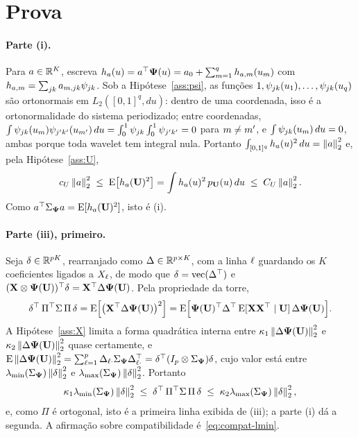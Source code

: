 \documentclass[11pt]{article}
\newcommand{\bPsi}{\boldsymbol{\Psi}}
\newcommand{\kron}{\otimes}
\newcommand{\lmin}{\lambda_{\min}}
\newcommand{\lmax}{\lambda_{\max}}
\DeclareMathOperator{\vecop}{vec}
\begin{document}
\section*{Prova}

\paragraph{Parte (i).}
Para $a \in \mathbb{R}^{K}$, escreva $h_a(u) = a\T\bPsi(u) = a_0 + \sum_{\md=1}^{q} h_{a,\md}(u_{\md})$ com
$h_{a,m} = \sum_{jk} a_{m,jk}\psi_{jk}$. Sob a Hipótese~\ref{ass:psi}, as funções
$1, \psi_{jk}(u_1), \ldots, \psi_{jk}(u_q)$ são ortonormais em $L_2([0,1]^q, du)$: dentro de uma
coordenada, isso é a ortonormalidade do sistema periodizado; entre coordenadas,
$\int \psi_{jk}(u_{m})\psi_{j'k'}(u_{m'})\,du = \int_0^1 \psi_{jk}\int_0^1 \psi_{j'k'} = 0$ para
$m \ne m'$, e $\int \psi_{jk}(u_{m})\,du = 0$, ambas porque toda wavelet tem integral nula.
Portanto $\int_{[0,1]^q} h_a(u)^2\,du = \left\lVert a \right\rVert_2^2$ e, pela Hipótese~\ref{ass:U},
\[
    c_U\left\lVert a \right\rVert_2^2 \;\le\; \mathrm{E}\bigl[h_a(\mathbf{U})^2\bigr] = \int h_a(u)^2\,p_{\mathbf{U}}(u)\,du \;\le\; C_U\left\lVert a \right\rVert_2^2 .
\]
Como $a\T\Gram_{\bPsi}a = \E[h_a(\bU)^2]$, isto é (i).

\paragraph{Parte (iii), primeiro.}
Seja $\delta \in \mathbb{R}^{pK}$, rearranjado como $\Delta \in \mathbb{R}^{p \times K}$, com a linha $\ell$ guardando os $K$
coeficientes ligados a $X_{\ell}$, de modo que $\delta = \vecop(\Delta\T)$ e
$(\bX \kron \bPsi(\bU))\T\delta = \bX\T\Delta\bPsi(\bU)$. Pela propriedade da torre,
\[
    \delta\T\,\Pi\T\Gram\,\Pi\,\delta
    = \E\Bigl[\bigl(\bX\T\Delta\bPsi(\bU)\bigr)^2\Bigr]
    = \E\Bigl[\bPsi(\bU)\T\Delta\T\,\E[\bX\bX\T \mid \bU]\,\Delta\bPsi(\bU)\Bigr] .
\]
A Hipótese~\ref{ass:X} limita a forma quadrática interna entre $\kappa_1\norm{\Delta\bPsi(\bU)}_2^2$ e
$\kappa_2\norm{\Delta\bPsi(\bU)}_2^2$ quase certamente, e
$\E\norm{\Delta\bPsi(\bU)}_2^2 = \sum_{\cv=1}^{p} \Delta_{\cv\cdot}\Gram_{\bPsi}\Delta_{\cv\cdot}\T
= \delta\T(I_p \kron \Gram_{\bPsi})\delta$, cujo valor está entre $\lmin(\Gram_{\bPsi})\norm{\delta}_2^2$ e
$\lmax(\Gram_{\bPsi})\norm{\delta}_2^2$. Portanto
\[
    \kappa_1\lmin(\Gram_{\bPsi})\norm{\delta}_2^2 \;\le\; \delta\T\,\Pi\T\Gram\,\Pi\,\delta \;\le\; \kappa_2\lmax(\Gram_{\bPsi})\norm{\delta}_2^2 ,
\]
e, como $\Pi$ é ortogonal, isto é a primeira linha exibida de (iii); a parte (i) dá a segunda. A
afirmação sobre compatibilidade é~\eqref{eq:compat-lmin}.
\end{document}
